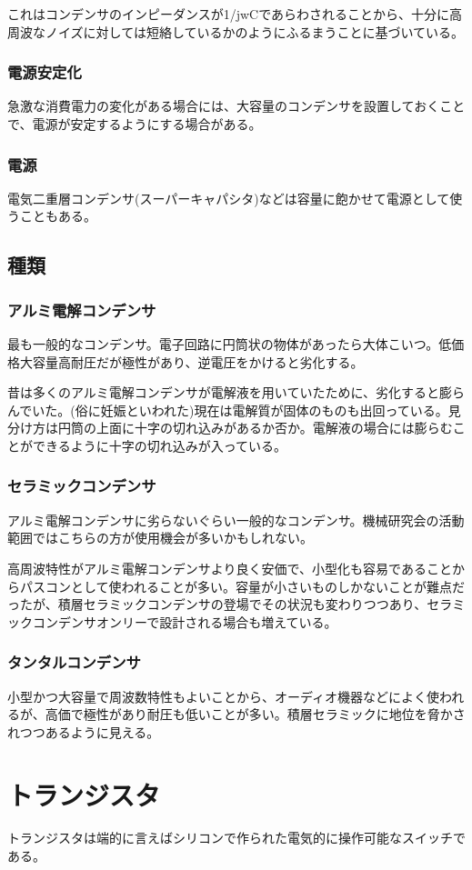 \documentclass[a4paper,titlepage]{ujarticle}
\begin{document}
これはコンデンサのインピーダンスが1/jwCであらわされることから、十分に高周波なノイズに対しては短絡しているかのようにふるまうことに基づいている。
\subsubsection{電源安定化}
急激な消費電力の変化がある場合には、大容量のコンデンサを設置しておくことで、電源が安定するようにする場合がある。
\subsubsection{電源}
電気二重層コンデンサ(スーパーキャパシタ)などは容量に飽かせて電源として使うこともある。
\subsection{種類}
\subsubsection{アルミ電解コンデンサ}
最も一般的なコンデンサ。電子回路に円筒状の物体があったら大体こいつ。低価格大容量高耐圧だが極性があり、逆電圧をかけると劣化する。

昔は多くのアルミ電解コンデンサが電解液を用いていたために、劣化すると膨らんでいた。(俗に妊娠といわれた)現在は電解質が固体のものも出回っている。見分け方は円筒の上面に十字の切れ込みがあるか否か。電解液の場合には膨らむことができるように十字の切れ込みが入っている。
\subsubsection{セラミックコンデンサ}
アルミ電解コンデンサに劣らないぐらい一般的なコンデンサ。機械研究会の活動範囲ではこちらの方が使用機会が多いかもしれない。

高周波特性がアルミ電解コンデンサより良く安価で、小型化も容易であることからパスコンとして使われることが多い。容量が小さいものしかないことが難点だったが、積層セラミックコンデンサの登場でその状況も変わりつつあり、セラミックコンデンサオンリーで設計される場合も増えている。
\subsubsection{タンタルコンデンサ}
小型かつ大容量で周波数特性もよいことから、オーディオ機器などによく使われるが、高価で極性があり耐圧も低いことが多い。積層セラミックに地位を脅かされつつあるように見える。
\section{トランジスタ}
トランジスタは端的に言えばシリコンで作られた電気的に操作可能なスイッチである。
\end{document}
